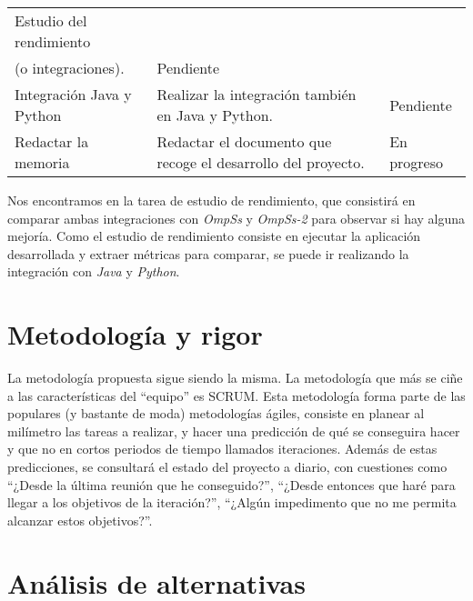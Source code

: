 \begin{longtable}{|l|l|l|}
Estudio del rendimiento                                                         & \begin{tabular}[c]{@{}l@{}}Estudio final del rendimiento de la integración\\ (o integraciones).\end{tabular}                                                                          & Pendiente   \\ \hline
Integración Java y Python                                                       & Realizar la integración también en Java y Python.                                                                                                                                     & Pendiente   \\ \hline
Redactar la memoria                                                             & Redactar el documento que recoge el desarrollo del proyecto.                                                                                                                          & En progreso \\ \hline
\end{longtable}

Nos encontramos en la tarea de estudio de rendimiento, que consistirá en comparar ambas integraciones con \textit{OmpSs} y \textit{OmpSs-2} para observar si hay alguna mejoría. 
\smallskip
Como el estudio de rendimiento consiste en ejecutar la aplicación desarrollada y extraer métricas para comparar, se puede ir realizando la integración con \textit{Java} y \textit{Python}.

\section{Metodología y rigor}

La metodología propuesta sigue siendo la misma. La metodología que más se ciñe a las características del “equipo” es SCRUM. Esta metodología forma parte de las populares (y bastante de moda) metodologías ágiles, consiste en planear al milímetro las tareas a realizar, y hacer una predicción de qué se conseguira hacer y que no en cortos periodos de tiempo llamados iteraciones. Además de estas predicciones, se consultará el
estado del proyecto a diario, con cuestiones como “¿Desde la última reunión que he conseguido?”,
“¿Desde entonces que haré para llegar a los objetivos de la iteración?”, “¿Algún impedimento que
no me permita alcanzar estos objetivos?”.

\section{Análisis de alternativas}

